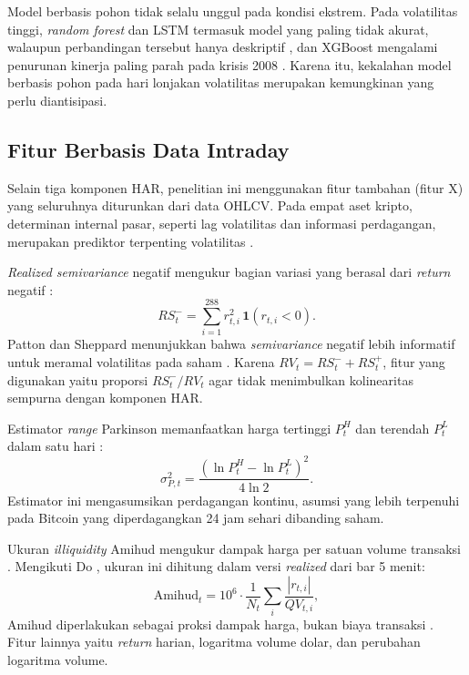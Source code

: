 Model berbasis pohon tidak selalu unggul pada kondisi ekstrem. Pada
volatilitas tinggi, \textit{random forest} dan LSTM termasuk model yang paling
tidak akurat, walaupun perbandingan tersebut hanya deskriptif
\cite{dudek2024}, dan XGBoost mengalami penurunan kinerja paling parah pada
krisis 2008 \cite{kilic2025}. Karena itu, kekalahan model berbasis pohon pada
hari lonjakan volatilitas merupakan kemungkinan yang perlu diantisipasi.

\subsection{Fitur Berbasis Data Intraday}
Selain tiga komponen HAR, penelitian ini menggunakan fitur tambahan (fitur X)
yang seluruhnya diturunkan dari data OHLCV. Pada empat aset kripto,
determinan internal pasar, seperti lag volatilitas dan informasi perdagangan,
merupakan prediktor terpenting volatilitas \cite{wang2023}.

\textit{Realized semivariance} negatif mengukur bagian variasi yang berasal
dari \textit{return} negatif \cite{barndorff2010}:
\begin{equation}
  RS_t^- = \sum_{i=1}^{288} r_{t,i}^2 \, \mathbf{1}(r_{t,i} < 0).
  \label{eq:semivarians}
\end{equation}
Patton dan Sheppard menunjukkan bahwa \textit{semivariance} negatif lebih
informatif untuk meramal volatilitas pada saham \cite{patton2015}. Karena
$RV_t = RS_t^- + RS_t^+$, fitur yang digunakan yaitu proporsi $RS_t^-/RV_t$
agar tidak menimbulkan kolinearitas sempurna dengan komponen HAR.

Estimator \textit{range} Parkinson memanfaatkan harga tertinggi $P^{H}_t$ dan
terendah $P^{L}_t$ dalam satu hari \cite{parkinson1980}:
\begin{equation}
  \sigma^2_{P,t} = \frac{(\ln P^{H}_t - \ln P^{L}_t)^2}{4 \ln 2}.
  \label{eq:parkinson}
\end{equation}
Estimator ini mengasumsikan perdagangan kontinu, asumsi yang lebih terpenuhi
pada Bitcoin yang diperdagangkan 24 jam sehari dibanding saham.

Ukuran \textit{illiquidity} Amihud mengukur dampak harga per satuan volume
transaksi \cite{amihud2002}. Mengikuti Do \cite{do2026}, ukuran ini dihitung
dalam versi \textit{realized} dari bar 5 menit:
\begin{equation}
  \text{Amihud}_t = 10^6 \cdot \frac{1}{N_t}\sum_{i}
  \frac{\left|r_{t,i}\right|}{QV_{t,i}},
  \label{eq:amihud}
\end{equation}
Amihud diperlakukan sebagai proksi dampak harga, bukan
biaya transaksi \cite{amihud2002,brauneis2021}. Fitur lainnya yaitu
\textit{return} harian, logaritma volume dolar, dan perubahan logaritma volume.

